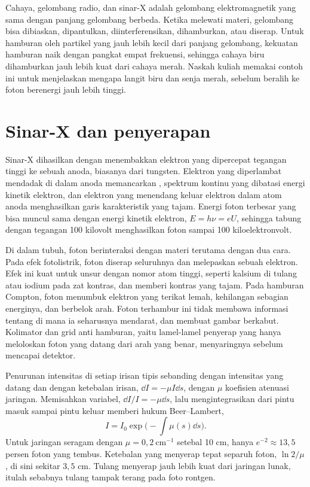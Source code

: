 Cahaya, gelombang radio, dan sinar-X adalah gelombang elektromagnetik yang sama dengan panjang gelombang berbeda.
Ketika melewati materi, gelombang bisa dibiaskan, dipantulkan, diinterferensikan, dihamburkan, atau diserap.
Untuk hamburan oleh partikel yang jauh lebih kecil dari panjang gelombang, kekuatan hamburan naik dengan pangkat
empat frekuensi, sehingga cahaya biru dihamburkan jauh lebih kuat dari cahaya merah. Naskah kuliah memakai contoh ini
untuk menjelaskan mengapa langit biru dan senja merah, sebelum beralih ke foton berenergi jauh lebih tinggi.

\section{Sinar-X dan penyerapan}

Sinar-X dihasilkan dengan menembakkan elektron yang dipercepat tegangan tinggi ke sebuah anoda, biasanya dari
tungsten. Elektron yang diperlambat mendadak di dalam anoda memancarkan , spektrum kontinu yang
dibatasi energi kinetik elektron, dan elektron yang menendang keluar elektron dalam atom anoda menghasilkan garis
karakteristik yang tajam. Energi foton terbesar yang bisa muncul sama dengan energi kinetik elektron, $E=h\nu=eU$,
sehingga tabung dengan tegangan 100 kilovolt menghasilkan foton sampai 100 kiloelektronvolt.

Di dalam tubuh, foton berinteraksi dengan materi terutama dengan dua cara. Pada efek fotolistrik, foton diserap
seluruhnya dan melepaskan sebuah elektron. Efek ini kuat untuk unsur dengan nomor atom tinggi, seperti
kalsium di tulang atau iodium pada zat kontras, dan memberi kontras yang tajam. Pada hamburan Compton, foton
menumbuk elektron yang terikat lemah, kehilangan sebagian energinya, dan berbelok arah. Foton terhambur ini tidak
membawa informasi tentang di mana ia seharusnya mendarat, dan membuat gambar berkabut. Kolimator dan grid anti
hamburan, yaitu lamel-lamel penyerap yang hanya meloloskan foton yang datang dari arah yang benar, menyaringnya
sebelum mencapai detektor.

Penurunan intensitas di setiap irisan tipis sebanding dengan intensitas yang datang dan dengan ketebalan irisan,
$\dd I=-\mu I\dd s$, dengan $\mu$ koefisien atenuasi jaringan. Memisahkan variabel, $\dd I/I=-\mu\dd s$, lalu
mengintegrasikan dari pintu masuk sampai pintu keluar memberi hukum Beer--Lambert,
\begin{equation}
I=I_0\exp\Big(-\int\mu(s)\dd s\Big).
\end{equation}
Untuk jaringan seragam dengan $\mu=0{,}2\ \mathrm{cm}^{-1}$ setebal 10 cm, hanya $e^{-2}\approx13{,}5$ persen foton
yang tembus. Ketebalan yang menyerap tepat separuh foton, $\ln2/\mu$, di sini sekitar $3{,}5$ cm. Tulang menyerap
jauh lebih kuat dari jaringan lunak, itulah sebabnya tulang tampak terang pada foto rontgen.

